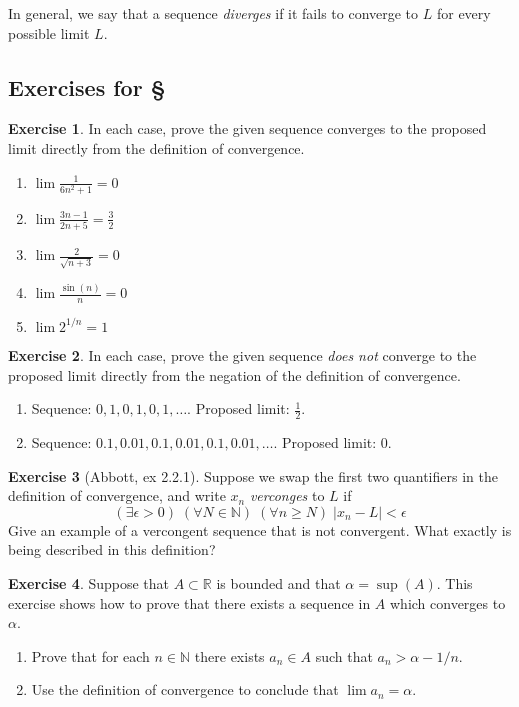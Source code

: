 \documentclass[11pt,oneside]{amsbook}
\newcommand{\N}{\mathbb N}
\newcommand{\R}{\mathbb R}
\theoremstyle{definition}
\newtheorem{exerc}{Exercise}[section]
\theoremstyle{plain}
\theoremstyle{definition}
\theoremstyle{remark}
\numberwithin{equation}{section}
\numberwithin{figure}{section}
\begin{document}
In general, we say that a sequence \emph{diverges} if it fails to converge to $L$ for every possible limit $L$.

\newpage
\subsection*{Exercises for \S \thesection}

\begin{exerc}
  In each case, prove the given sequence converges to the proposed limit directly from the definition of convergence.
  \begin{enumerate}\itemsep10pt
    \item $\displaystyle\lim\frac{1}{6n^2+1}=0$
    \item $\displaystyle\lim\frac{3n-1}{2n+5}=\frac32$
    \item $\displaystyle\lim\frac{2}{\sqrt{n+3}}=0$
    \item $\displaystyle\lim\frac{\sin(n)}{n}=0$
    \item $\displaystyle\lim2^{1/n}=1$
  \end{enumerate}
\end{exerc}

\begin{exerc}
  In each case, prove the given sequence \emph{does not} converge to the proposed limit directly from the negation of the definition of convergence.
  \begin{enumerate}
    \item Sequence: $0,1,0,1,0,1,\ldots$. Proposed limit: $\frac12$.
    \item Sequence: $0.1,0.01,0.1,0.01,0.1,0.01,\ldots$. Proposed limit: $0$.
  \end{enumerate}
\end{exerc}

\begin{exerc}[Abbott, ex 2.2.1]
  Suppose we swap the first two quantifiers in the definition of convergence, and write $x_n$ \emph{verconges} to $L$ if
  \[(\exists\epsilon>0)\;(\forall N\in\N)\;(\forall n\geq N)\;|x_n-L|<\epsilon
  \]
  Give an example of a vercongent sequence that is not convergent. What exactly is being described in this definition?
\end{exerc}
  
\begin{exerc}
  Suppose that $A\subset\R$ is bounded and that $\alpha=\sup(A)$.  This exercise shows how to prove that there exists a sequence in $A$ which converges to $\alpha$.
  \begin{enumerate}
    \item Prove that for each $n\in\N$ there exists $a_n\in A$ such that $a_n>\alpha-1/n$.
    \item Use the definition of convergence to conclude that $\lim a_n=\alpha$.
  \end{enumerate}
\end{exerc}
\end{document}

